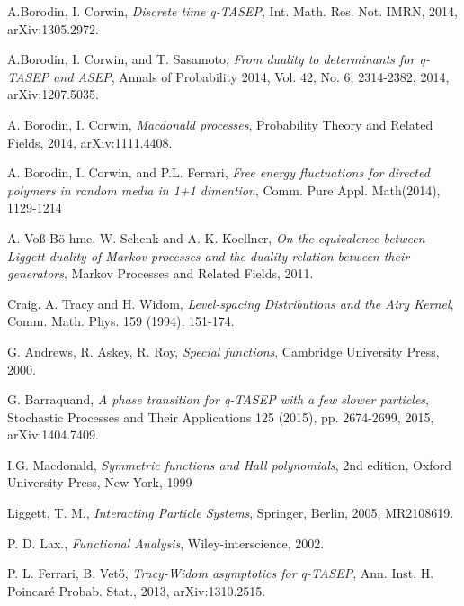 \begin{singlespace}



\begin{thebibliography}{9}

  A.Borodin, I. Corwin,
  \emph{Discrete time q-TASEP},
  Int. Math. Res. Not. IMRN,
  2014,
  arXiv:1305.2972.

  A.Borodin, I. Corwin, and T. Sasamoto,
  \emph{From duality to determinants for q-TASEP and ASEP},
  Annals of Probability 2014,
  Vol. 42, No. 6, 2314-2382,
  2014,
  arXiv:1207.5035.

  A. Borodin, I. Corwin,
  \emph{Macdonald processes},
  Probability Theory and Related Fields,
  2014,
  arXiv:1111.4408.

  A. Borodin, I. Corwin, and P.L. Ferrari,
  \emph{Free energy fluctuations for directed polymers in random media in 1+1 dimention},
  Comm. Pure Appl. Math(2014),
  1129-1214

  A. Vo\ss -B\"o hme, W. Schenk and A.-K. Koellner,
  \emph{On the equivalence between Liggett duality of Markov processes and the duality relation between their generators},
  Markov Processes and Related Fields,
  2011.

  Craig. A. Tracy and H. Widom,
  \emph{Level-spacing Distributions and the Airy Kernel},
  Comm. Math. Phys. 159 (1994),
  151-174.

  G. Andrews, R. Askey, R. Roy,
  \emph{Special functions},
  Cambridge University Press,
  2000.

  G. Barraquand,
  \emph{A phase transition for q-TASEP with a few slower particles},
  Stochastic Processes and Their Applications 125 (2015),
  pp. 2674-2699,
  2015,
  arXiv:1404.7409.

  I.G. Macdonald,
  \emph{Symmetric functions and Hall polynomials},
  2nd edition, 
  Oxford University Press,
  New York,
  1999

  Liggett, T. M.,
  \emph{Interacting Particle Systems},
  Springer,
  Berlin,
  2005,
  MR2108619.

  P. D. Lax.,
  \emph{Functional Analysis},
  Wiley-interscience,
  2002.

  P. L. Ferrari, B. Vet\H o,
  \emph{Tracy-Widom asymptotics for q-TASEP},
  Ann. Inst. H. Poincar\' e Probab. Stat.,
  2013,
  arXiv:1310.2515.

\end{thebibliography}

\end{singlespace}
